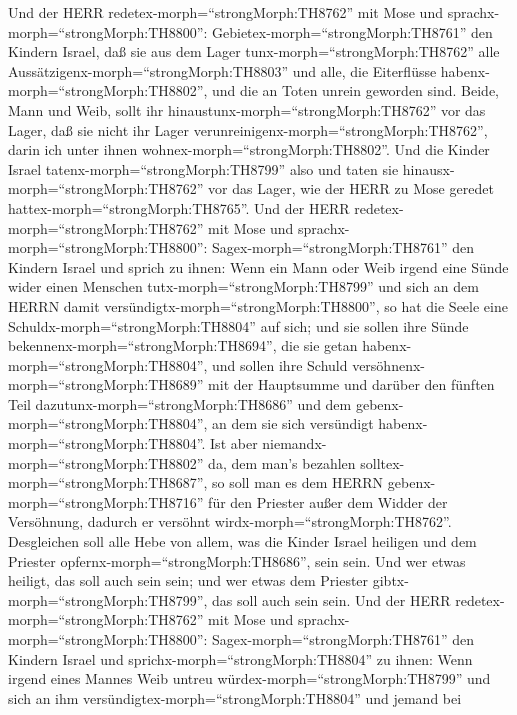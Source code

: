  Und der HERR redetex-morph=``strongMorph:TH8762'' mit Mose
und sprachx-morph=``strongMorph:TH8800'': 
Gebietex-morph=``strongMorph:TH8761'' den Kindern Israel, daß sie aus
dem Lager tunx-morph=``strongMorph:TH8762'' alle
Aussätzigenx-morph=``strongMorph:TH8803'' und alle, die Eiterflüsse
habenx-morph=``strongMorph:TH8802'', und die an Toten unrein geworden
sind.  Beide, Mann und Weib, sollt ihr
hinaustunx-morph=``strongMorph:TH8762'' vor das Lager, daß sie nicht ihr
Lager verunreinigenx-morph=``strongMorph:TH8762'', darin ich unter ihnen
wohnex-morph=``strongMorph:TH8802''.  Und die Kinder Israel
tatenx-morph=``strongMorph:TH8799'' also und taten sie
hinausx-morph=``strongMorph:TH8762'' vor das Lager, wie der HERR zu Mose
geredet hattex-morph=``strongMorph:TH8765''.  Und der HERR
redetex-morph=``strongMorph:TH8762'' mit Mose und
sprachx-morph=``strongMorph:TH8800'': 
Sagex-morph=``strongMorph:TH8761'' den Kindern Israel und sprich zu
ihnen: Wenn ein Mann oder Weib irgend eine Sünde wider einen Menschen
tutx-morph=``strongMorph:TH8799'' und sich an dem HERRN damit
versündigtx-morph=``strongMorph:TH8800'', so hat die Seele eine
Schuldx-morph=``strongMorph:TH8804'' auf sich;  und sie
sollen ihre Sünde bekennenx-morph=``strongMorph:TH8694'', die sie getan
habenx-morph=``strongMorph:TH8804'', und sollen ihre Schuld
versöhnenx-morph=``strongMorph:TH8689'' mit der Hauptsumme und darüber
den fünften Teil dazutunx-morph=``strongMorph:TH8686'' und dem
gebenx-morph=``strongMorph:TH8804'', an dem sie sich versündigt
habenx-morph=``strongMorph:TH8804''.  Ist aber
niemandx-morph=``strongMorph:TH8802'' da, dem man's bezahlen
solltex-morph=``strongMorph:TH8687'', so soll man es dem HERRN
gebenx-morph=``strongMorph:TH8716'' für den Priester außer dem Widder
der Versöhnung, dadurch er versöhnt wirdx-morph=``strongMorph:TH8762''.
 Desgleichen soll alle Hebe von allem, was die Kinder Israel
heiligen und dem Priester opfernx-morph=``strongMorph:TH8686'', sein
sein.  Und wer etwas heiligt, das soll auch sein sein; und
wer etwas dem Priester gibtx-morph=``strongMorph:TH8799'', das soll auch
sein sein.  Und der HERR
redetex-morph=``strongMorph:TH8762'' mit Mose und
sprachx-morph=``strongMorph:TH8800'': 
Sagex-morph=``strongMorph:TH8761'' den Kindern Israel und
sprichx-morph=``strongMorph:TH8804'' zu ihnen: Wenn irgend eines Mannes
Weib untreu würdex-morph=``strongMorph:TH8799'' und sich an ihm
versündigtex-morph=``strongMorph:TH8804''  und jemand bei
